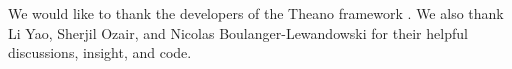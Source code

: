 We would like to thank the developers of the Theano framework \cite{theano1, theano2}. We also thank Li Yao, Sherjil Ozair, and Nicolas Boulanger-Lewandowski for their helpful discussions, insight, and code.